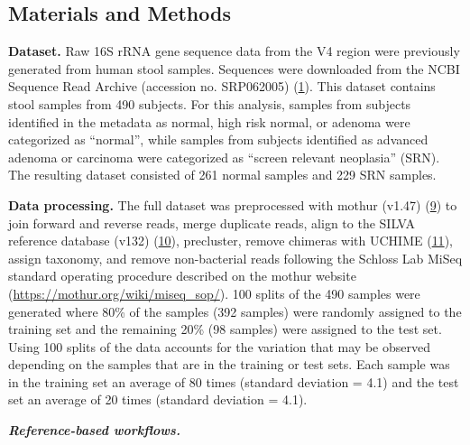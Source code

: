 \documentclass[
]{article}
\begin{document}
\hypertarget{materials-and-methods}{%
\subsection{Materials and Methods}\label{materials-and-methods}}

\textbf{Dataset.} Raw 16S rRNA gene sequence data from the V4 region
were previously generated from human stool samples. Sequences were
downloaded from the NCBI Sequence Read Archive (accession no. SRP062005)
(\protect\hyperlink{ref-baxter2016}{1}). This dataset contains stool
samples from 490 subjects. For this analysis, samples from subjects
identified in the metadata as normal, high risk normal, or adenoma were
categorized as ``normal'', while samples from subjects identified as
advanced adenoma or carcinoma were categorized as ``screen relevant
neoplasia'' (SRN). The resulting dataset consisted of 261 normal samples
and 229 SRN samples.

\textbf{Data processing.} The full dataset was preprocessed with mothur
(v1.47) (\protect\hyperlink{ref-schloss2009}{9}) to join forward and
reverse reads, merge duplicate reads, align to the SILVA reference
database (v132) (\protect\hyperlink{ref-quast2013}{10}), precluster,
remove chimeras with UCHIME (\protect\hyperlink{ref-edgar2011}{11}),
assign taxonomy, and remove non-bacterial reads following the Schloss
Lab MiSeq standard operating procedure described on the mothur website
(\url{https://mothur.org/wiki/miseq_sop/}). 100 splits of the 490
samples were generated where 80\% of the samples (392 samples) were
randomly assigned to the training set and the remaining 20\% (98
samples) were assigned to the test set. Using 100 splits of the data
accounts for the variation that may be observed depending on the samples
that are in the training or test sets. Each sample was in the training
set an average of 80 times (standard deviation = 4.1) and the test set
an average of 20 times (standard deviation = 4.1).

\textbf{\emph{Reference-based workflows.}}
\end{document}
